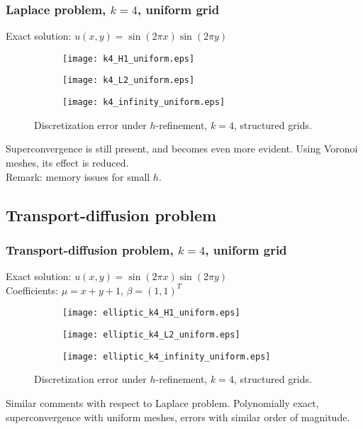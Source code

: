 \documentclass[10pt]{beamer}
\begin{document}
\begin{frame} \frametitle{Laplace problem, $k=4$, uniform grid}
	Exact solution: $u(x,y)=\sin(2\pi x) \sin(2 \pi y)$
\begin{figure}[H]
	\centering
	\begin{subfigure}{0.32\textwidth}
		\centering
		\texttt{[image: k4\_H1\_uniform.eps]}
		\label{fig:k4_H1_uniform}
	\end{subfigure}
	\begin{subfigure}{0.32\textwidth}
		\centering
		\texttt{[image: k4\_L2\_uniform.eps]}
		\label{fig:k4_L2_uniform}
	\end{subfigure}
	\begin{subfigure}{0.32\textwidth}
		\centering
		\texttt{[image: k4\_infinity\_uniform.eps]}
		\label{fig:k4_infinity_uniform}
	\end{subfigure}
	\caption{Discretization error under $h$-refinement, $k=4$, structured grids.}
	\label{fig:k4_uniform}
\end{figure}
	Superconvergence is still present, and becomes even more evident. Using Voronoi meshes, its effect is reduced. \\
	Remark: memory issues for small $h$.
\end{frame}


\subsection{Transport-diffusion problem}


\begin{frame} \frametitle{Transport-diffusion problem, $k=4$, uniform grid}
	Exact solution: $u(x,y)=\sin(2\pi x) \sin(2 \pi y)$ \\
	Coefficients: $\mu=x+y+1$, $\beta=(1,1)^T$
\begin{figure}[H]
	\centering
	\begin{subfigure}{0.32\textwidth}
		\centering
		\texttt{[image: elliptic\_k4\_H1\_uniform.eps]}
		\label{fig:ell_k4_H1_uniform}
	\end{subfigure}
	\begin{subfigure}{0.32\textwidth}
		\centering
		\texttt{[image: elliptic\_k4\_L2\_uniform.eps]}
		\label{fig:ell_k4_L2_uniform}
	\end{subfigure}
	\begin{subfigure}{0.32\textwidth}
		\centering
		\texttt{[image: elliptic\_k4\_infinity\_uniform.eps]}
		\label{fig:ell_k4_infinity_uniform}
	\end{subfigure}
	\caption{Discretization error under $h$-refinement, $k=4$, structured grids.}
	\label{fig:ell_k4_uniform}
\end{figure}
	Similar comments with respect to Laplace problem. Polynomially exact, superconvergence with uniform meshes, errors with similar order of magnitude.
\end{frame}
\end{document}
